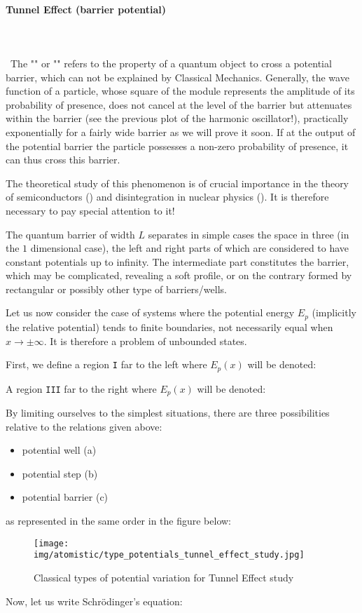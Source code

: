 	
	
	\paragraph{Tunnel Effect (barrier potential)}\mbox{}\\\\\
	The "" or "" refers to the property of a quantum object to cross a potential barrier, which can not be explained by Classical Mechanics. Generally, the wave function of a particle, whose square of the module represents the amplitude of its probability of presence, does not cancel at the level of the barrier but attenuates within the barrier (see the previous plot of the harmonic oscillator!), practically exponentially for a fairly wide barrier as we will prove it soon. If at the output of the potential barrier the particle possesses a non-zero probability of presence, it can thus cross this barrier.

	The theoretical study of this phenomenon is of crucial importance in the theory of semiconductors () and disintegration in nuclear physics (). It is therefore necessary to pay special attention to it!

	The quantum barrier of width $L$ separates in simple cases the space in three (in the $1$ dimensional case), the left and right parts of which are considered to have constant potentials up to infinity. The intermediate part constitutes the barrier, which may be complicated, revealing a soft profile, or on the contrary formed by rectangular or possibly other type of barriers/wells.

	Let us now consider the case of systems where the potential energy $E_p$ (implicitly the relative potential) tends to finite boundaries, not necessarily equal when $x\rightarrow \pm \infty$. It is therefore a problem of unbounded states.

	First, we define a region \texttt{I} far to the left where $E_p(x)$ will be denoted:
	
	A region \texttt{III} far to the right where $E_p(x)$ will be denoted:
	
	By limiting ourselves to the simplest situations, there are three possibilities relative to the relations given above: 
	\begin{itemize}
		\item potential well (a)
		\item potential step (b)
		\item potential barrier (c)
	\end{itemize}
	as represented in the same order in the figure below:
	\begin{figure}[H]
		\centering
		\texttt{[image: img/atomistic/type\_potentials\_tunnel\_effect\_study.jpg]}	
		\caption{Classical types of potential variation for Tunnel Effect study}
	\end{figure}
	Now, let us write Schrödinger's equation:
	
